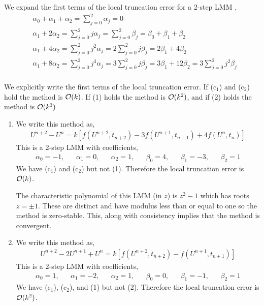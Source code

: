 \documentclass[10pt]{article}
\begin{document}
\begin{solution}[Solution]

We expand the first terms of the local truncation error for a 2-step LMM ,
\begin{align*}
    & \alpha_0 + \alpha_1 + \alpha_2 = \sum_{j=0}^{2} \alpha_j = 0 \tag{c$_1$} \\
    &\alpha_1 + 2\alpha_2 = \sum_{j=0}^{2} j\alpha_j  = \sum_{j=0}^{2}\beta_j= \beta_0 + \beta_1 + \beta_2 \tag{c$_2$} \\
    & \alpha_1 + 4\alpha_2 = \sum_{j=0}^{2}j^2\alpha_j = 2\sum_{j=0}^{2} j \beta_j = 2\beta_1 + 4\beta_2 \tag{1}\\
    & \alpha_1 + 8\alpha_2 = \sum_{j=0}^{2}j^3\alpha_j = 3\sum_{j=0}^{2} j \beta_j = 3\beta_1 + 12\beta_2  = 3\sum_{j=0}^{2}j^2 \beta_j \tag{2}\\
\end{align*}

We explicitly write the first terms of the local truncation error. If (c$_1$) and (c$_2$) hold the method is \( \mathcal{O}(k) \). If (1) holds the method is \( \mathcal{O}(k^2) \), and if (2) holds the method is \( \mathcal{O}(k^3) \)

\begin{enumerate}[label=(\alph*)]
    \item We write this method as,
    \begin{align*}
        U^{n+2} - U^n = k[f(U^{n+2},t_{n+2}) - 3f(U^{n+1},t_{n+1}) + 4f(U^{n},t_{n})]
    \end{align*}
    This is a 2-step LMM with coefficients,
    \begin{align*}
        \alpha_0 = -1, && \alpha_1 = 0, && \alpha_2 = 1,
        && \beta_0 = 4, && \beta_1 = -3, && \beta_2 = 1
    \end{align*}
    We have (c$_1$) and (c$_2$) but not (1). Therefore the local truncation error is \( \mathcal{O}(k) \).

    The characteristic polynomial of this LMM (in \( z \)) is \( z^2-1 \) which has roots \( z = \pm 1 \). These are distinct and have modulus less than or equal to one so the method is zero-stable. This, along with consistency implies that the method is convergent.

    \item We write this method as,
    \begin{align*}
        U^{n+2} -2 U^{n+1} + U^n = k[f(U^{n+2},t_{n+2}) - f(U^{n+1},t_{n+1})]
    \end{align*}
    This is a 2-step LMM with coefficients,
    \begin{align*}
        \alpha_0 = 1, && \alpha_1 = -2, && \alpha_2 = 1,
        && \beta_0 = 0, && \beta_1 = -1, && \beta_2 = 1
    \end{align*}
    We have (c$_1$), (c$_2$), and (1) but not (2). Therefore the local truncation error is \( \mathcal{O}(k^2) \).


\end{enumerate}
\end{solution}
\end{document}
